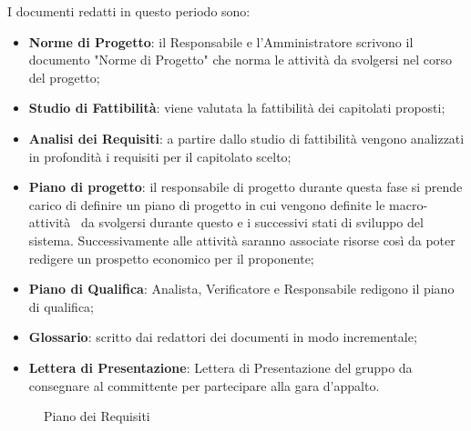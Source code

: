 {{	I documenti redatti in questo periodo sono:
	\begin{itemize}
		\item \textbf{Norme di Progetto}: il Responsabile e l'Amministratore scrivono il documento "Norme di Progetto" che norma le attività da svolgersi nel corso del progetto;
		\item \textbf{Studio di Fattibilità}: viene valutata la fattibilit\`a dei capitolati proposti;
		\item \textbf{Analisi dei Requisiti}: a partire dallo studio di fattibilità vengono analizzati in profondità i requisiti per il capitolato scelto;
		\item \textbf{Piano di progetto}: il responsabile di progetto durante questa fase si prende carico di definire un piano di progetto in cui vengono definite le macro-attivit\`a~ da svolgersi durante questo e i successivi stati di sviluppo del sistema. Successivamente alle attività saranno associate risorse così da poter redigere un prospetto economico per il proponente;
		\item \textbf{Piano di Qualifica}: Analista, Verificatore e Responsabile redigono il piano di qualifica;
		\item \textbf{Glossario}: scritto dai redattori dei documenti in modo incrementale;
		\item \textbf{Lettera di Presentazione}: Lettera di Presentazione del gruppo da consegnare al committente per partecipare alla gara d'appalto.
	\end{itemize}

	\begin{landscape}
		\thispagestyle{empty}
		\begin{figure}[H]
			\parbox[c][\textwidth][s]{\linewidth}{
			\centering
			\vspace*{\fill}
			\vspace*{\fill}
			\label{fig:pianorequisiti}
			\caption{Piano dei Requisiti}}
		\end{figure}
	\end{landscape}

}}
